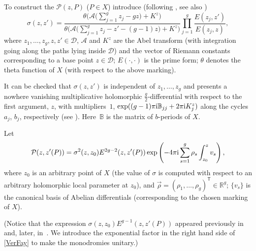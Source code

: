 \documentclass[pdftex]{sigma}
\numberwithin{equation}{section}
\theoremstyle{definition}
\begin{document}
To construct the $\mathcal{P}(z, P)$ ($P\in X$) introduce (following \cite[formula (1.13)]{Fay}, see also \cite{Ver})
\begin{equation}
\label{Troy 2}
\sigma(z,z')=\frac{\theta\bigl(\mathscr{A}\bigl(\sum_{j=1}^g z_j-gz\bigr)+K^z\bigr)}{\theta\bigl(\mathscr{A}\bigl(\sum_{j=1}^g z_j-z'-(g-1)z\bigr)+K^z\bigr)}\prod_{j=1}^g\frac{E(z_j,z')}{E(z_j,z)},
\end{equation}
where $z_1,\dots,z_g,z,z'\in\mathcal{D}$, $\mathscr{A}$ and $K^{z}$ are the Abel transform (with integration going along the paths lying inside $\mathcal{D}$) and the vector of Riemann constants corresponding to a base point $z\in \mathcal{D}$; $E(\cdot, \cdot)$ is the prime form; $\theta$ denotes the theta function of $X$ (with respect to the above marking).

It can be checked that $\sigma(z, z')$ is independent of $z_1,\dots,z_g$ and presents a nowhere vanishing multiplicative holomorphic $\frac{g}{2}$-differential with respect to the first argument, $z$, with multipliers~$1$, $ \exp((g-1)\pi {\rm i} \mathbb{B}_{jj}+2\pi {\rm i} K^z_j)$
along the cycles $a_j$, $b_j$, respectively (see \cite[Proposition 1.2]{Fay}). Here~$\mathbb{B}$ is the matrix of $b$-periods of $X$.

Let
\begin{gather}
\label{VerFay}
\mathcal{P}(z,z'(P))=\sigma^2(z,z_0)E^{2g-2}(z,z'(P))\exp\left(-4\pi {\rm i} \sum_{s=1}^{g}\rho_s\int_{z_0}^z v_s\right), \end{gather}
where $z_0$ is an arbitrary point of $X$ (the value of $\sigma$ is computed with respect to an arbitrary holomorphic local parameter at $z_0$), and $\vec{\rho}=(\rho_1,\dots,\rho_g)^{\mathsf T}\in\mathbb{R}^g$; $\{v_s\}$ is the canonical basis of Abelian differentials (corresponding to the chosen marking of $X$).

(Notice that the expression $\sigma(z,z_0)E^{g-1}(z,z'(P))$ appeared previously in \cite{Ver} and, later, in~\cite{Fay}. We introduce the exponential factor in the right hand side of \eqref{VerFay} to make the monodromies unitary.)
\end{document}
